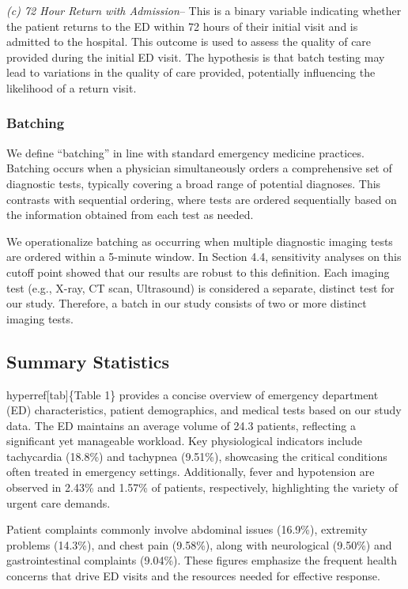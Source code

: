 \documentclass[,,nonblindrev]{informs}
\begin{document}
\emph{(c) 72 Hour Return with Admission}-- This is a binary variable
indicating whether the patient returns to the ED within 72 hours of
their initial visit and is admitted to the hospital. This outcome is
used to assess the quality of care provided during the initial ED visit.
The hypothesis is that batch testing may lead to variations in the
quality of care provided, potentially influencing the likelihood of a
return visit.

\hypertarget{batching}{%
\subsubsection{Batching}\label{batching}}

We define ``batching'' in line with standard emergency medicine
practices. Batching occurs when a physician simultaneously orders a
comprehensive set of diagnostic tests, typically covering a broad range
of potential diagnoses. This contrasts with sequential ordering, where
tests are ordered sequentially based on the information obtained from
each test as needed.

We operationalize batching as occurring when multiple diagnostic imaging
tests are ordered within a 5-minute window. In Section 4.4, sensitivity
analyses on this cutoff point showed that our results are robust to this
definition. Each imaging test (e.g., X-ray, CT scan, Ultrasound) is
considered a separate, distinct test for our study. Therefore, a batch
in our study consists of two or more distinct imaging tests.

\hypertarget{summary-statistics}{%
\subsection{Summary Statistics}\label{summary-statistics}}

hyperref{[}tab{]}\{Table 1\} provides a concise overview of emergency
department (ED) characteristics, patient demographics, and medical tests
based on our study data. The ED maintains an average volume of 24.3
patients, reflecting a significant yet manageable workload. Key
physiological indicators include tachycardia (18.8\%) and tachypnea
(9.51\%), showcasing the critical conditions often treated in emergency
settings. Additionally, fever and hypotension are observed in 2.43\% and
1.57\% of patients, respectively, highlighting the variety of urgent
care demands.

Patient complaints commonly involve abdominal issues (16.9\%), extremity
problems (14.3\%), and chest pain (9.58\%), along with neurological
(9.50\%) and gastrointestinal complaints (9.04\%). These figures
emphasize the frequent health concerns that drive ED visits and the
resources needed for effective response.
\end{document}
